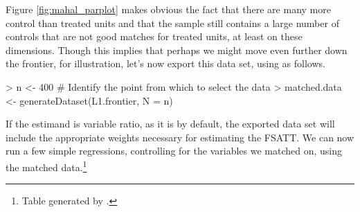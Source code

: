 \documentclass[nojss]{jss}
\begin{document}
Figure \ref{fig:mahal_parplot} makes obvious the fact that there are
many more control than treated units and that the sample still
contains a large number of controls that are not good matches for
treated units, at least on these dimensions. Though this implies that
perhaps we might move even further down the frontier, for
illustration, let's now export this data set, using
 as follows.

\begin{Schunk}
\begin{Sinput}
> n <- 400 # Identify the point from which to select the data
> matched.data <- generateDataset(L1.frontier, N = n)
\end{Sinput}
\end{Schunk}

If the estimand is variable ratio, as it is by default, the exported
data set will include the appropriate weights necessary for estimating
the FSATT. We can now run a few simple regressions, controlling for
the variables we matched on, using the matched data.\footnote{Table
  generated by  \citep{hlavac14}.}
\end{document}

